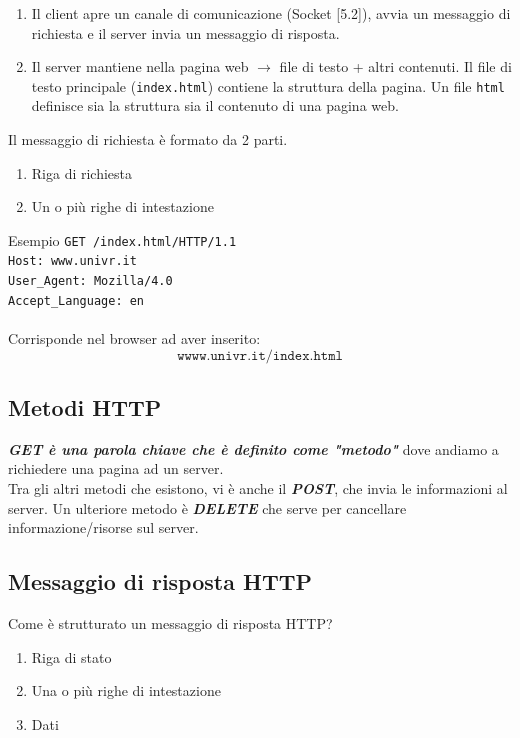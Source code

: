 \documentclass[a4paper]{article}
\begin{document}
\begin{enumerate}
    \item Il client apre un canale di comunicazione (Socket [5.2]), avvia un messaggio di richiesta e il server invia un messaggio di risposta.
    \item Il server mantiene nella pagina web $\rightarrow$ file di testo + altri contenuti. Il file di testo principale (\texttt{index.html}) contiene la struttura della pagina. Un file \texttt{html} definisce sia la struttura sia il contenuto di una pagina web.
\end{enumerate}
Il messaggio di richiesta è formato da 2 parti.
\begin{enumerate}
    \item Riga di richiesta
    \item Un o più righe di intestazione
\end{enumerate}

\begin{examplebox}{Esempio}
\texttt{GET /index.html/HTTP/1.1}\\
        \texttt{Host: www.univr.it\\
        User\_Agent: Mozilla/4.0\\
        Accept\_Language: en\\}
        \\
Corrisponde nel browser ad aver inserito:
\[
\texttt{wwww.univr.it/index.html}
\]
\end{examplebox}

\subsection{Metodi HTTP}

    \textit{\textbf{GET è una parola chiave che è definito come "metodo"}} dove andiamo a richiedere una pagina ad un server. \\
Tra gli altri metodi che esistono, vi è anche il \textit{\textbf{POST}}, che invia le informazioni al server. Un ulteriore metodo è \textit{\textbf{DELETE}} che serve per cancellare informazione/risorse sul server.

\subsection{Messaggio di risposta HTTP}

Come è strutturato un messaggio di risposta HTTP? 
\begin{enumerate}
    \item Riga di stato
    \item Una o più righe di intestazione
    \item Dati
\end{enumerate}
\end{document}
